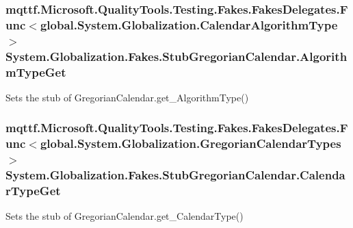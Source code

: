 \hypertarget{class_system_1_1_globalization_1_1_fakes_1_1_stub_gregorian_calendar_a813b46ee03ea0868172da7127f409934}{
\subsubsection[{Algorithm\-Type\-Get}]{\setlength{\rightskip}{0pt plus 5cm}mqttf.\-Microsoft.\-Quality\-Tools.\-Testing.\-Fakes.\-Fakes\-Delegates.\-Func$<$global.\-System.\-Globalization.\-Calendar\-Algorithm\-Type$>$ System.\-Globalization.\-Fakes.\-Stub\-Gregorian\-Calendar.\-Algorithm\-Type\-Get}}\label{class_system_1_1_globalization_1_1_fakes_1_1_stub_gregorian_calendar_a813b46ee03ea0868172da7127f409934}


Sets the stub of Gregorian\-Calendar.\-get\-\_\-\-Algorithm\-Type()

\hypertarget{class_system_1_1_globalization_1_1_fakes_1_1_stub_gregorian_calendar_aa6d4802a173ce3b4cde185c28da0374f}{
\subsubsection[{Calendar\-Type\-Get}]{\setlength{\rightskip}{0pt plus 5cm}mqttf.\-Microsoft.\-Quality\-Tools.\-Testing.\-Fakes.\-Fakes\-Delegates.\-Func$<$global.\-System.\-Globalization.\-Gregorian\-Calendar\-Types$>$ System.\-Globalization.\-Fakes.\-Stub\-Gregorian\-Calendar.\-Calendar\-Type\-Get}}\label{class_system_1_1_globalization_1_1_fakes_1_1_stub_gregorian_calendar_aa6d4802a173ce3b4cde185c28da0374f}


Sets the stub of Gregorian\-Calendar.\-get\-\_\-\-Calendar\-Type()

